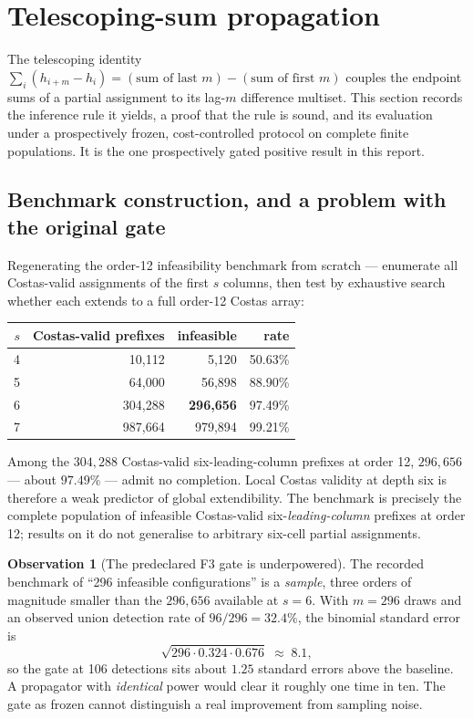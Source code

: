 \documentclass[11pt,a4paper]{article}
\theoremstyle{definition}
\newtheorem{observation}[theorem]{Observation}
\begin{document}
\section{Telescoping-sum propagation}
\label{sec:tmprop}

The telescoping identity $\sum_i(h_{i+m}-h_i)=(\text{sum of last }m)-(\text{sum
of first }m)$ couples the endpoint sums of a partial assignment to its
lag-$m$ difference multiset. This section records the inference rule it yields,
a proof that the rule is sound, and its evaluation under a prospectively frozen,
cost-controlled protocol on complete finite populations. It is the one
prospectively gated positive result in this report.

\subsection{Benchmark construction, and a problem with the original gate}
Regenerating the order-12 infeasibility benchmark from scratch --- enumerate all
Costas-valid assignments of the first $s$ columns, then test by exhaustive search
whether each extends to a full order-12 Costas array:

\begin{center}
\begin{tabular}{@{}rrrr@{}}
\toprule
$s$ & Costas-valid prefixes & infeasible & rate \\
\midrule
4 & 10{,}112 & 5{,}120 & 50.63\% \\
5 & 64{,}000 & 56{,}898 & 88.90\% \\
6 & 304{,}288 & \textbf{296{,}656} & 97.49\% \\
7 & 987{,}664 & 979{,}894 & 99.21\% \\
\bottomrule
\end{tabular}
\end{center}

\noindent Among the $304{,}288$ Costas-valid six-leading-column prefixes at
order 12, $296{,}656$ --- about $97.49\%$ --- admit no completion. Local Costas
validity at depth six is therefore a weak predictor of global extendibility. The
benchmark is precisely the complete population of infeasible Costas-valid
six-\emph{leading-column} prefixes at order 12; results on it do not generalise
to arbitrary six-cell partial assignments.

\begin{observation}[The predeclared F3 gate is underpowered]
\label{obs:gate}
The recorded benchmark of ``296 infeasible configurations'' is a \emph{sample},
three orders of magnitude smaller than the $296{,}656$ available at $s=6$. With
$m=296$ draws and an observed union detection rate of $96/296=32.4\%$, the
binomial standard error is
\[
\sqrt{296\cdot0.324\cdot0.676}\;\approx\;8.1,
\]
so the gate at 106 detections sits about $1.25$ standard errors above the
baseline. A propagator with \emph{identical} power would clear it roughly one
time in ten. The gate as frozen cannot distinguish a real improvement from
sampling noise.
\end{observation}
\end{document}
